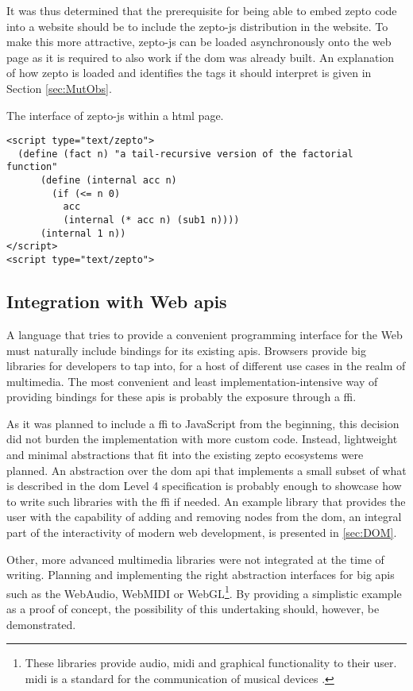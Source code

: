 \documentclass[oneside,11pt,xetex]{scrbook}
\begin{document}
It was thus determined that the prerequisite for being able to embed zepto code into
a website should be to include the zepto-js distribution in the website. To make
this more attractive, zepto-js can be loaded asynchronously onto the web page as it
is required to also work if the \gls{dom} was already built. An explanation of how
zepto is loaded and identifies the tags it should interpret is given in Section \ref{sec:MutObs}.

\begin{listing}[H]
\caption{The interface of zepto-js within a \gls{html} page.}
\begin{verbatim}
<script type="text/zepto">
  (define (fact n) "a tail-recursive version of the factorial function"
      (define (internal acc n)
        (if (<= n 0)
          acc
          (internal (* acc n) (sub1 n))))
      (internal 1 n))
</script>
<script type="text/zepto">
\end{verbatim}
\label{fig:zpjs}
\end{listing}

\subsection{Integration with Web \glspl{api}}

A language that tries to provide a convenient programming interface for the Web must
naturally include bindings for its existing \glspl{api}. Browsers provide big libraries
for developers to tap into, for a host of different use cases in the realm of multimedia.
The most convenient and least implementation-intensive way of providing bindings for
these \glspl{api} is probably the exposure through a \gls{ffi}.

As it was planned to include a \gls{ffi} to JavaScript from the beginning, this decision
did not burden the implementation with more custom code. Instead, lightweight and minimal
abstractions that fit into the existing zepto ecosystems were planned. An abstraction
over the \gls{dom} \gls{api} that implements a small subset of what is described in
the \gls{dom} Level 4 specification \parencite{DOM4} is probably enough to showcase how to
write such libraries with the \gls{ffi} if needed. An example library that provides the
user with the capability of adding and removing nodes from the \gls{dom}, an integral
part of the interactivity of modern web development, is presented in \ref{sec:DOM}.

Other, more advanced multimedia libraries were not integrated at the time of writing.
Planning and implementing the right abstraction interfaces for big \glspl{api} such as
the WebAudio, WebMIDI or WebGL\footnote{These libraries provide audio, \gls{midi} and
graphical functionality to their user. \gls{midi} is a standard for the communication
of musical devices \parencite{MIDI}.}. By providing a simplistic example as a proof
of concept, the possibility of this undertaking should, however, be demonstrated.
\end{document}
